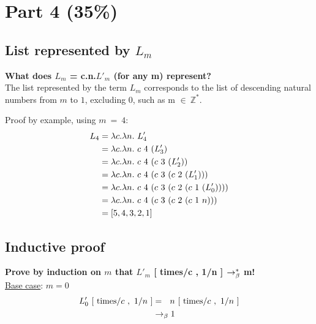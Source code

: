 \documentclass{article}
\begin{document}
	
	\section{Part 4 (35\%)}

	\begin{Large}
	
	\subsection{List represented by $L_m$}
	
		\textbf{What does $L_m$ = \lamb c.\lamb n.$L'_m$ (for any m) represent?}\\
		
		The list represented by the term $L_m$ corresponds to the list of descending natural numbers from $m$ to $1$, excluding 0, such as m $\in \ \mathbb{Z}^*$.
		\newline
		
		Proof by example, using $m \ = \ 4$:
		\begin{align*}
			L_4 &= \la c.\la n. \ L_4^\prime \\
			&= \la c.\la n. \ c \  4 \ ( L_3^\prime ) \\
			&= \la c.\la n. \ c \  4 \ ( c \ 3 \ (L_2^\prime )) \\
			&= \la c.\la n. \ c \  4 \ ( c \ 3 \ (c \ 2 \ (L_1^\prime ))) \\
			&= \la c.\la n. \ c \  4 \ ( c \ 3 \ (c \ 2 \ (c \ 1 \ (L_0^\prime )))) \\
			&= \la c.\la n. \ c \  4 \ ( c \ 3 \ (c \ 2 \ (c \ 1 \ n))) \\
			&= [5,4,3,2,1]
		\end{align*}
		\newline
		
	\subsection{Inductive proof}

		\textbf{Prove by induction on $m$ that $L'_m$ [ times/c , 1/n ] $\rightarrow_\beta^*$  m!}\\
		
		\underline{Base case}: $m=0$
		\begin{align*}
			L_0^\prime \ [\ \tim / c \ , \ 1/n \ ] &= \saq n \ [\ \tim / c \ , \ 1/n \ ] \\
			&\equals 1
		\end{align*}
		

\end{Large}
\end{document}
